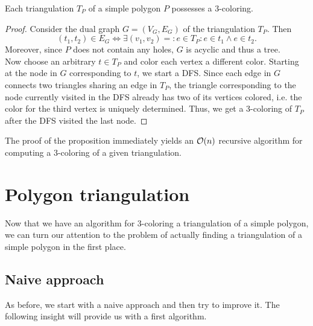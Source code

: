     \begin{proposition}
        Each triangulation $T_P$ of a simple polygon $P$ possesses a 3-coloring.
    \end{proposition}
    \begin{proof}
        Consider the dual graph $G = (V_G, E_G)$ of the triangulation $T_P$. Then
        $$(t_1, t_2) \in E_G \iff \exists (v_1, v_2) =: e \in T_P : e \in t_1 \land e \in t_2 .$$ 
        Moreover, since $P$ does not contain any holes, $G$ is acyclic and thus a tree. \\
        Now choose an arbitrary $t \in T_P$ and color each vertex a different color. Starting at the node in $G$ corresponding to $t$, we start a DFS. Since each edge in $G$ connects two triangles sharing an edge in $T_P$, the triangle corresponding to the node currently visited in the DFS already has two of its vertices colored, i.e. the color for the third vertex is uniquely determined. Thus, we get a 3-coloring of $T_P$ after the DFS visited the last node. 
    \end{proof}

    \begin{remark}
        The proof of the proposition immediately yields an $\mathcal{O}(n)$ recursive algorithm for computing a 3-coloring of a given triangulation.
    \end{remark}

\section{Polygon triangulation}
    Now that we have an algorithm for 3-coloring a triangulation of a simple polygon, we can turn our attention to the problem of actually finding a triangulation of a simple polygon in the first place. 

    \subsection{Naive approach}
        As before, we start with a naive approach and then try to improve it. The following insight will provide us with a first algorithm.

